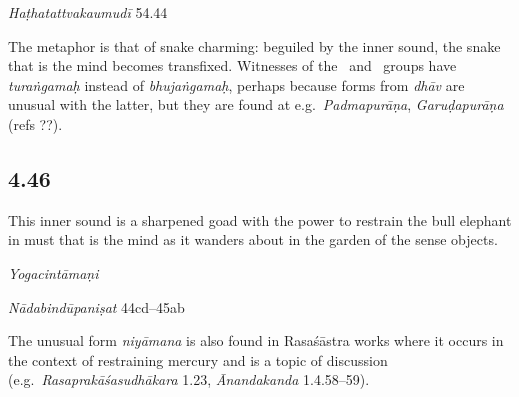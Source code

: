 \begin{ekdosis}
\begin{testimonia}[hp04_045]
\emph{Haṭhatattvakaumudī} 54.44
\begin{versinnote}
\end{versinnote}
\end{testimonia}

\begin{philcomm}[hp04_045]
The metaphor is that of snake charming: beguiled by the inner sound, the snake that is the mind becomes transfixed. Witnesses of the \gamma \ and \delta \ groups have \emph{turaṅgamaḥ} instead of \emph{bhujaṅgamaḥ}, perhaps because forms from \emph{dhāv} are unusual with the latter, but they are found at e.g.~\emph{Padmapurāṇa}, \emph{Garuḍapurāṇa} (refs ??). 
\end{philcomm}

\subsection*{4.46}
\begin{translation}[hp04_046]
This inner sound is a sharpened goad with the power to restrain the bull elephant in must that is the mind as it wanders about in the garden of the sense objects.
\end{translation}


\begin{testimonia}[hp04_046]
\emph{Yogacintāmaṇi}
\begin{versinnote}
\end{versinnote}

\emph{Nādabindūpaniṣat} 44cd–45ab
\begin{versinnote}
\end{versinnote}
\end{testimonia}

\begin{philcomm}[hp04_046]
The unusual form \emph{niyāmana} is also found in Rasaśāstra works where it occurs in the context of restraining mercury and is a topic of discussion (e.g.~\emph{Rasaprakāśasudhākara} 1.23, \emph{Ānandakanda} 1.4.58–59).
\end{philcomm}



\end{ekdosis}
